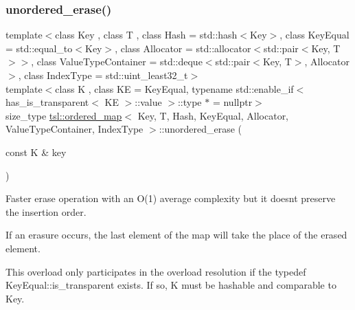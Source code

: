 \subsubsection{\texorpdfstring{unordered\_erase()}{unordered\_erase()}\hspace{0.1cm}{\footnotesize\ttfamily [5/6]}}
{\footnotesize\ttfamily template$<$class Key , class T , class Hash  = std\+::hash$<$\+Key$>$, class Key\+Equal  = std\+::equal\+\_\+to$<$\+Key$>$, class Allocator  = std\+::allocator$<$std\+::pair$<$\+Key, T$>$$>$, class Value\+Type\+Container  = std\+::deque$<$std\+::pair$<$\+Key, T$>$, Allocator$>$, class Index\+Type  = std\+::uint\+\_\+least32\+\_\+t$>$ \\
template$<$class K , class KE  = Key\+Equal, typename std\+::enable\+\_\+if$<$ has\+\_\+is\+\_\+transparent$<$ K\+E $>$\+::value $>$\+::type $\ast$  = nullptr$>$ \\
size\+\_\+type \mbox{\hyperlink{classtsl_1_1ordered__map}{tsl\+::ordered\+\_\+map}}$<$ Key, T, Hash, Key\+Equal, Allocator, Value\+Type\+Container, Index\+Type $>$\+::unordered\+\_\+erase (\begin{DoxyParamCaption}\item[{const K \&}]{key }\end{DoxyParamCaption})\hspace{0.3cm}{\ttfamily [inline]}}





Faster erase operation with an O(1) average complexity but it doesn\textquotesingle{}t preserve the insertion order.

If an erasure occurs, the last element of the map will take the place of the erased element.

This overload only participates in the overload resolution if the typedef Key\+Equal\+::is\+\_\+transparent exists. If so, K must be hashable and comparable to Key. \mbox{\label{classtsl_1_1ordered__map_ac13787e3ff3e2c7ffbdd7f4f7b8ce081}} 
